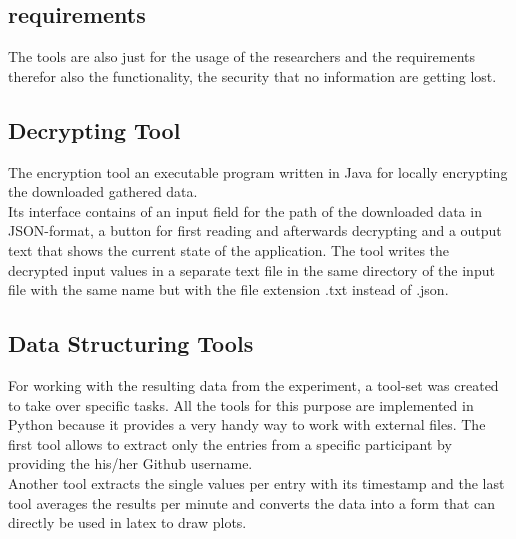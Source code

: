 \subsection{requirements}
The tools are also just for the usage of the researchers and the requirements therefor also the functionality, the security that no information are getting lost.

\subsection{Decrypting Tool}
The encryption tool an executable program written in Java for locally encrypting the downloaded gathered data.\\
Its interface contains of an input field for the path of the downloaded data in JSON-format, a button for first reading and afterwards decrypting and a output text that shows the current state of the application. The tool writes the decrypted input values in a separate text file in the same directory of the input file with the same name but with the file extension .txt instead of .json. 

\subsection{Data Structuring Tools}
For working with the resulting data from the experiment, a tool-set was created to take over specific tasks. All the tools for this purpose are implemented in Python because it provides a very handy way to work with external files. 
The first tool allows to extract only the entries from a specific participant by providing the his/her Github username.\\
Another tool extracts the single values per entry with its timestamp and the last tool averages the results per minute and converts the data into a form that can directly be used in latex to draw plots.

